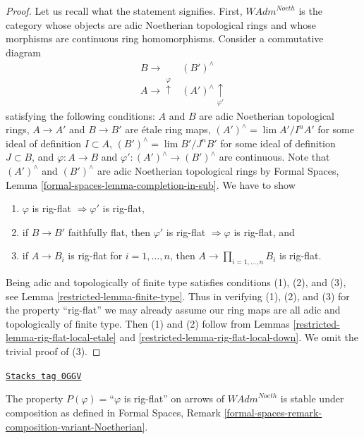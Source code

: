 \begin{proof}

Let us recall what the statement signifies. First,
$\textit{WAdm}^{Noeth}$ is the category whose objects are
adic Noetherian topological rings and whose morphisms are
continuous ring homomorphisms. Consider a commutative diagram
$$
\begin{array}{cc}B \longrightarrow & (B')^\wedge \\ A \longrightarrow\overset{\varphi}{\uparrow} & (A')^\wedge \underset{\varphi'}{\uparrow}\end{array}
$$
satisfying the following conditions:
$A$ and $B$ are adic Noetherian topological rings,
$A \to A'$ and $B \to B'$ are \'etale ring maps,
$(A')^\wedge = \lim A'/I^nA'$ for some ideal of definition $I \subset A$,
$(B')^\wedge = \lim B'/J^nB'$ for some ideal of definition $J \subset B$, and
$\varphi : A \to B$ and $\varphi' : (A')^\wedge \to (B')^\wedge$
are continuous. Note that $(A')^\wedge$ and $(B')^\wedge$ are
adic Noetherian topological rings by
Formal Spaces, Lemma \ref{formal-spaces-lemma-completion-in-sub}.
We have to show
\begin{enumerate}
\item $\varphi$ is rig-flat $\Rightarrow \varphi'$ is rig-flat,
\item if $B \to B'$ faithfully flat, then $\varphi'$ is rig-flat
$\Rightarrow \varphi$ is rig-flat, and
\item if $A \to B_i$ is rig-flat for $i = 1, \ldots, n$, then
$A \to \prod_{i = 1, \ldots, n} B_i$ is rig-flat.
\end{enumerate}
Being adic and topologically of finite type satisfies
conditions (1), (2), and (3), see Lemma \ref{restricted-lemma-finite-type}.
Thus in verifying (1), (2), and (3) for the property
``rig-flat'' we may already assume our ring maps are all adic
and topologically of finite type. Then (1) and (2) follow
from Lemmas \ref{restricted-lemma-rig-flat-local-etale} and
\ref{restricted-lemma-rig-flat-local-down}.
We omit the trivial proof of (3).
\end{proof}

\begin{lemma}
\label{restricted-lemma-composition-rig-flat-continuous}
\href{https://stacks.math.columbia.edu/tag/0GGV}{\texttt{Stacks tag 0GGV}}

The property $P(\varphi)=$``$\varphi$ is rig-flat''
on arrows of $\textit{WAdm}^{Noeth}$ is stable under composition
as defined in Formal Spaces, Remark
\ref{formal-spaces-remark-composition-variant-Noetherian}.
\end{lemma}


